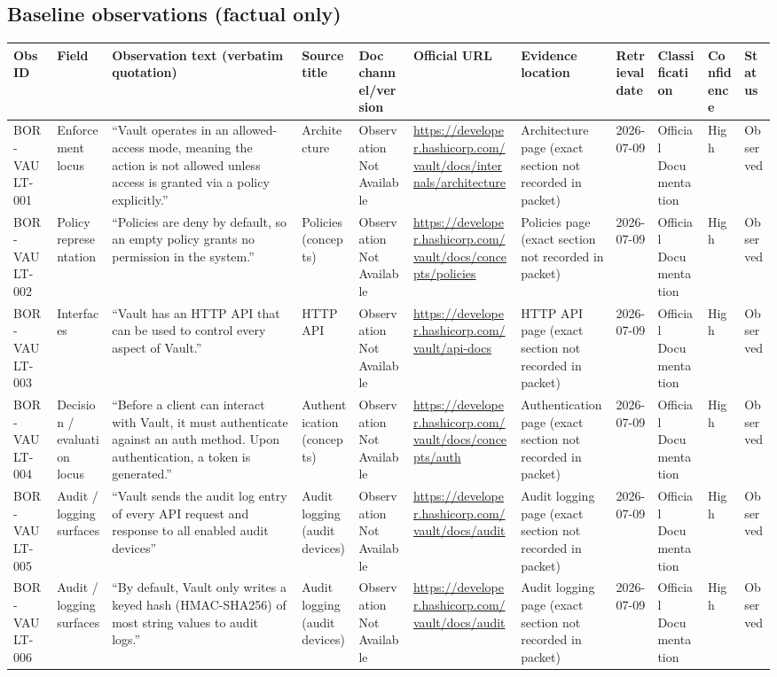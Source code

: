 \documentclass[11pt]{article}
\begin{document}
\subsection*{Baseline observations (factual only)}
\begin{longtable}{@{}L{0.95in}L{1.05in}L{2.05in}L{1.55in}L{0.95in}L{1.55in}L{1.10in}L{0.75in}L{0.95in}L{0.75in}L{0.8in}@{}}
\toprule
Obs ID & Field & Observation text (verbatim quotation) & Source title & Doc channel/version & Official URL & Evidence location & Retrieval date & Classification & Confidence & Status\\
\midrule
\endhead
BOR-VAULT-001 & Enforcement locus & ``Vault operates in an allowed-access mode, meaning the action is not allowed unless access is granted via a policy explicitly.'' & Architecture & Observation Not Available & \url{https://developer.hashicorp.com/vault/docs/internals/architecture} & Architecture page (exact section not recorded in packet) & 2026-07-09 & Official Documentation & High & Observed\\
BOR-VAULT-002 & Policy representation & ``Policies are deny by default, so an empty policy grants no permission in the system.'' & Policies (concepts) & Observation Not Available & \url{https://developer.hashicorp.com/vault/docs/concepts/policies} & Policies page (exact section not recorded in packet) & 2026-07-09 & Official Documentation & High & Observed\\
BOR-VAULT-003 & Interfaces & ``Vault has an HTTP API that can be used to control every aspect of Vault.'' & HTTP API & Observation Not Available & \url{https://developer.hashicorp.com/vault/api-docs} & HTTP API page (exact section not recorded in packet) & 2026-07-09 & Official Documentation & High & Observed\\
BOR-VAULT-004 & Decision / evaluation locus & ``Before a client can interact with Vault, it must authenticate against an auth method. Upon authentication, a token is generated.'' & Authentication (concepts) & Observation Not Available & \url{https://developer.hashicorp.com/vault/docs/concepts/auth} & Authentication page (exact section not recorded in packet) & 2026-07-09 & Official Documentation & High & Observed\\
BOR-VAULT-005 & Audit / logging surfaces & ``Vault sends the audit log entry of every API request and response to all enabled audit devices'' & Audit logging (audit devices) & Observation Not Available & \url{https://developer.hashicorp.com/vault/docs/audit} & Audit logging page (exact section not recorded in packet) & 2026-07-09 & Official Documentation & High & Observed\\
BOR-VAULT-006 & Audit / logging surfaces & ``By default, Vault only writes a keyed hash (HMAC-SHA256) of most string values to audit logs.'' & Audit logging (audit devices) & Observation Not Available & \url{https://developer.hashicorp.com/vault/docs/audit} & Audit logging page (exact section not recorded in packet) & 2026-07-09 & Official Documentation & High & Observed\\
\bottomrule
\end{longtable}
\end{document}
